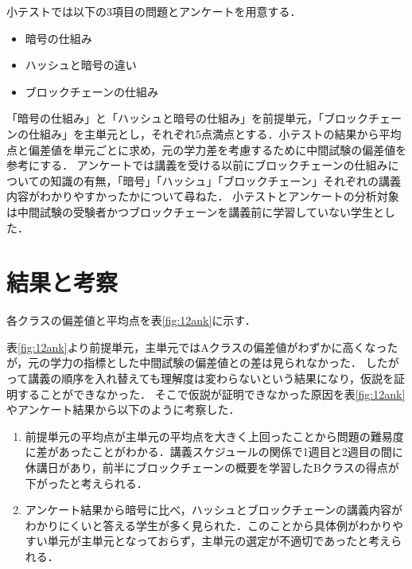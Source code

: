 \documentclass[twocolumn,10pt,a4j]{jsarticle}
\begin{document}
小テストでは以下の3項目の問題とアンケートを用意する．
\begin{itemize}
\item 暗号の仕組み
\item ハッシュと暗号の違い
\item ブロックチェーンの仕組み
\end{itemize}


「暗号の仕組み」と「ハッシュと暗号の仕組み」を前提単元，「ブロックチェーンの仕組み」を主単元とし，それぞれ5点満点とする．小テストの結果から平均点と偏差値を単元ごとに求め，元の学力差を考慮するために中間試験の偏差値を参考にする．
アンケートでは講義を受ける以前にブロックチェーンの仕組みについての知識の有無，「暗号」「ハッシュ」「ブロックチェーン」それぞれの講義内容がわかりやすかったかについて尋ねた．
小テストとアンケートの分析対象は中間試験の受験者かつブロックチェーンを講義前に学習していない学生とした．


\section{結果と考察}
各クラスの偏差値と平均点を表\ref{fig:12ank}に示す．

表\ref{fig:12ank}より前提単元，主単元ではAクラスの偏差値がわずかに高くなったが，元の学力の指標とした中間試験の偏差値との差は見られなかった．
したがって講義の順序を入れ替えても理解度は変わらないという結果になり，仮説を証明することができなかった．
そこで仮説が証明できなかった原因を表\ref{fig:12ank}やアンケート結果から以下のように考察した．


\begin{enumerate}
\item 前提単元の平均点が主単元の平均点を大きく上回ったことから問題の難易度に差があったことがわかる．講義スケジュールの関係で1週目と2週目の間に休講日があり，前半にブロックチェーンの概要を学習したBクラスの得点が下がったと考えられる．
\item アンケート結果から暗号に比べ，ハッシュとブロックチェーンの講義内容がわかりにくいと答える学生が多く見られた．このことから具体例がわかりやすい単元が主単元となっておらず，主単元の選定が不適切であったと考えられる．
\end{enumerate}
\end{document}
